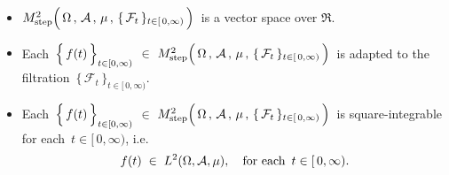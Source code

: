 \vskip 0.5cm
\begin{remark}
\mbox{}
\vskip 0.2cm
\begin{itemize}
\item
	$M^{2}_{\textnormal{step}}\!
	\left(\,
		\overset{{\color{white}.}}{\Omega} \,,\, \mathcal{A} \,,\, \mu \,,\, \{\,\mathcal{F}_{t}\,\}_{t \in [\,0,\infty)}
		\,\right)$\,
	is a vector space over $\Re$.
\item
	Each
	\,$\left\{\,\overset{{\color{white}.}}{f}(t)\,\right\}_{t\in[0,\infty)}$
	$\in$
	$M^{2}_{\textnormal{step}}\!
	\left(\,
		\overset{{\color{white}.}}{\Omega} \,,\, \mathcal{A} \,,\, \mu \,,\, \{\,\mathcal{F}_{t}\,\}_{t \in [\,0,\infty)}
		\,\right)$\,
	is adapted to the filtration
	\,$\{\,\mathcal{F}_{t}\,\}_{t \in [\,0,\infty)}$.
\item
	Each
	\,$\left\{\,\overset{{\color{white}.}}{f}(t)\,\right\}_{t\in[0,\infty)}$
	$\in$
	$M^{2}_{\textnormal{step}}\!
	\left(\,
		\overset{{\color{white}.}}{\Omega} \,,\, \mathcal{A} \,,\, \mu \,,\, \{\,\mathcal{F}_{t}\,\}_{t \in [\,0,\infty)}
		\,\right)$\,
	is square-integrable for each \,$t \in [\,0,\infty)$, i.e.
	\begin{equation*}
	f(t) \; \in \; L^{2}(\Omega,\mathcal{A},\mu),
	\quad
	\textnormal{for each \,$t \in [\,0,\infty)$.}
	\end{equation*}
\end{itemize}
\end{remark}


